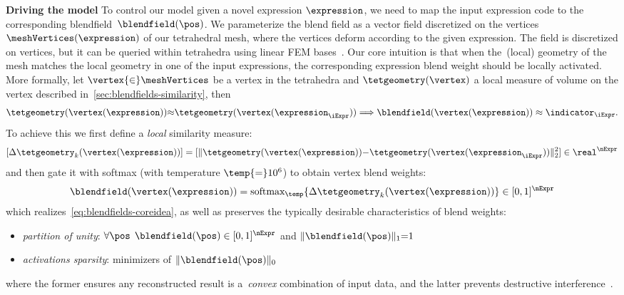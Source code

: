     \noindent\textbf{Driving the model}
    To control our model given a novel expression $\expression$, we need to map
    the input expression code to the corresponding blendfield~$\blendfield(\pos)$.
    We parameterize the blend field as a vector field discretized on the vertices
    $\meshVertices(\expression)$ of our tetrahedral mesh, where the vertices
    deform according to the given expression.
    The field is discretized on vertices, but it can be queried within tetrahedra
    using linear FEM bases~\cite{monk2003finite}.
    Our core intuition is that when the~(local) geometry of the mesh matches the
    local geometry in one of the input expressions, the corresponding expression
    blend weight should be locally activated.
    More formally, let $\vertex{\in} \meshVertices$ be a vertex in the tetrahedra and $\tetgeometry(\vertex)$ a local measure of volume on the vertex described in~\cref{sec:blendfields-similarity}, then
    \begin{align}
      \tetgeometry(\vertex(\expression)) {\approx} \tetgeometry(\vertex(\expression_\iExpr))
      \Longrightarrow
      \blendfield(\vertex(\expression)) \approx \indicator_\iExpr.
      \label{eq:blendfields-coreidea}
    \end{align}
    To achieve this we first define a \textit{local} similarity measure:
    \begin{equation}
      \label{eq:blendfields-local-similarity}
      [ \Delta\tetgeometry_k(\vertex(\expression))] = [ \| \tetgeometry(\vertex(\expression)) {-} \tetgeometry(\vertex(\expression_\iExpr))\|_2^2 ] \in \real^{\nExpr}
    \end{equation}
    and then gate it with softmax (with temperature $\temp{=}10^6$) to obtain vertex blend weights:
    \begin{align}
      \label{eq:blendfields-blendfield}
      \blendfield(\vertex(\expression)) = \text{softmax}_\temp \{ \Delta\tetgeometry_k(\vertex(\expression)) \} \in [0,1]^{\nExpr}
    \end{align}
    which realizes~\cref{eq:blendfields-coreidea}, as well as preserves the typically desirable characteristics of blend weights:
    \begin{itemize}
      \item \textit{partition of unity}: $\forall\pos \:\: \blendfield(\pos) \in [0,1]^\nExpr$ and $\| \blendfield(\pos) \|_1{=}1$
      \item \textit{activations sparsity}: minimizers of $\|\blendfield(\pos)\|_0$
    \end{itemize}
    where the former ensures any reconstructed result is a~\textit{convex} combination of input data, and the latter prevents destructive interference~\cite{ichim2015dynamic}.


